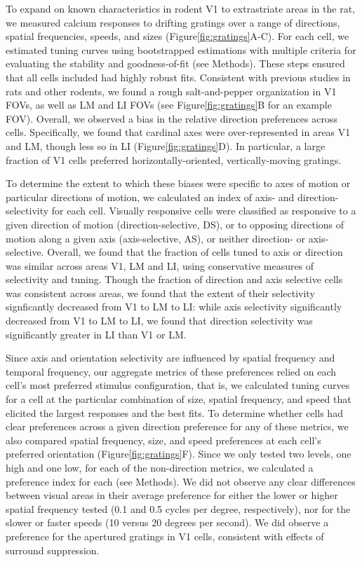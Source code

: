 To expand on known characteristics in rodent V1 to extrastriate areas in the rat, we measured calcium responses to drifting gratings over a range of directions, spatial frequencies, speeds, and sizes (Figure\ref{fig:gratings}A-C). For each cell, we estimated tuning curves using bootstrapped estimations with multiple criteria for evaluating the stability and goodness-of-fit (see Methods)\cite{Liang2018a}. These steps ensured that all cells included had highly robust fits. Consistent with previous studies in rats and other rodents, we found a rough salt-and-pepper organization in V1 FOVs, as well as LM and LI FOVs (see Figure\ref{fig:gratings}B for an example FOV). Overall, we observed a bias in the relative direction preferences across cells. Specifically, we found that cardinal axes were over-represented in areas V1 and LM, though less so in LI (Figure\ref{fig:gratings}D). In particular, a large fraction of V1 cells preferred horizontally-oriented, vertically-moving gratings.  

To determine the extent to which these biases were specific to axes of motion or particular directions of motion, we calculated an index of axis- and direction-selectivity for each cell. Visually responsive cells were classified as responsive to a given direction of motion (direction-selective, DS), or to opposing directions of motion along a given axis (axis-selective, AS), or neither direction- or axis-selective. Overall, we found that the fraction of cells tuned to axis or direction was similar across areas V1, LM and LI, using conservative measures of selectivity and tuning. Though the fraction of direction and axis selective cells was consistent across areas,  we found that the extent of their selectivity signficantly decreased from V1 to LM to LI: while axis selectivity significantly decreased from V1 to LM to LI, we found that direction selectivity was significantly greater in LI than V1 or LM. 

Since axis and orientation selectivity are influenced by spatial frequency and temporal frequency, our aggregate metrics of these preferences relied on each cell's most preferred stimulus configuration, that is, we calculated tuning curves for a cell at the particular combination of size, spatial frequency, and speed that elicited the largest responses and the best fits. To determine whether cells had clear preferences across a given direction preference for any of these metrics, we also compared spatial frequency, size, and speed preferences at each cell's preferred orientation (Figure\ref{fig:gratings}F). Since we only tested two levels, one high and one low, for each of the non-direction metrics, we calculated a preference index for each (see Methods). We did not observe any clear differences between visual areas in their average preference for either the lower or higher spatial frequency tested (0.1 and 0.5 cycles per degree, respectively), nor for the slower or faster speeds (10 versus 20 degrees per second). We did observe a preference for the apertured gratings in V1 cells, consistent with effects of surround suppression.

